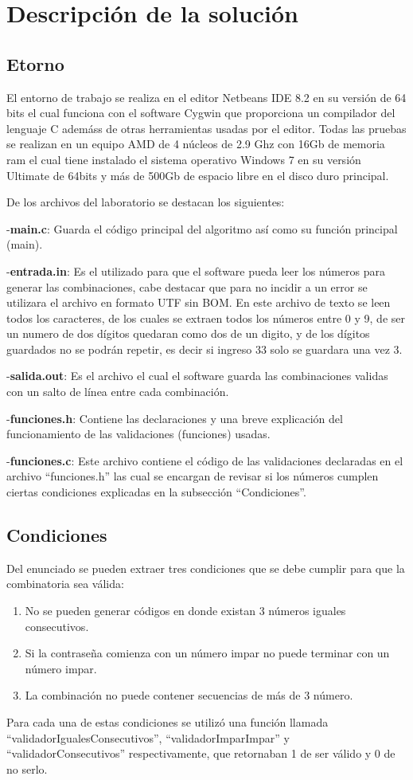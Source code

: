 \documentclass[9pt,twocolumn,twoside]{optica}
\begin{document}
\section{Descripción de la solución}
\subsection{Etorno}
El entorno de trabajo se realiza en el editor Netbeans IDE 8.2 en su versión de 64 bits el cual funciona con el software Cygwin que proporciona un compilador del lenguaje C ademáss de otras herramientas usadas por el editor.
Todas las pruebas se realizan en un equipo AMD de 4 núcleos de 2.9 Ghz con 16Gb de memoria ram el cual tiene instalado el sistema operativo Windows 7 en su versión Ultimate de 64bits y más de 500Gb de espacio libre en el disco duro principal.

De los archivos del laboratorio se destacan los siguientes:

-\textbf{main.c}: Guarda el código principal del algoritmo así como su función principal (main).

-\textbf{entrada.in}: Es el utilizado para que el software pueda leer los números para generar las combinaciones, cabe destacar que para no incidir a un error se utilizara el archivo en formato UTF sin BOM.
En este archivo de texto se leen todos los caracteres, de los cuales se extraen todos los números entre 0 y 9, de ser un numero de dos dígitos quedaran como dos de un digito, y de los dígitos guardados no se podrán repetir, es decir si ingreso 33 solo se guardara una vez 3.

-\textbf{salida.out}: Es el archivo el cual el software guarda las combinaciones validas con un salto de línea entre cada combinación.

-\textbf{funciones.h}: Contiene las declaraciones y una breve explicación del funcionamiento de las validaciones (funciones) usadas.

-\textbf{funciones.c}: Este archivo contiene el código de las validaciones declaradas en el archivo “funciones.h” las cual se encargan de revisar si los números cumplen ciertas condiciones explicadas en la subsección “Condiciones”.

\subsection{Condiciones}
Del enunciado se pueden extraer tres condiciones que se debe cumplir para que la combinatoria sea válida:
\begin{enumerate}
\item No se pueden generar códigos en donde existan 3 números iguales consecutivos.
\item Si la contraseña comienza con un número impar no puede terminar con un número impar.
\item La combinación no puede contener secuencias de más de 3 número.
\end{enumerate}
Para cada una de estas condiciones se utilizó una función llamada “validadorIgualesConsecutivos”, “validadorImparImpar” y “validadorConsecutivos” respectivamente, que retornaban 1 de ser válido y 0 de no serlo.
\end{document}
